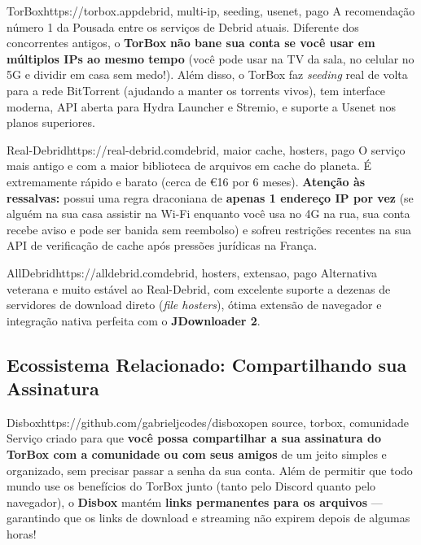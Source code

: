 \documentclass{pousadaguide}
\begin{document}
\begin{ferramenta}[goat,logo=torbox]{TorBox}{https://torbox.app}{debrid, multi-ip, seeding, usenet, pago}
A recomendação número 1 da Pousada entre os serviços de Debrid atuais. Diferente dos concorrentes antigos, o \textbf{TorBox} \textbf{não bane sua conta se você usar em múltiplos IPs ao mesmo tempo} (você pode usar na TV da sala, no celular no 5G e dividir em casa sem medo!). Além disso, o TorBox faz \emph{seeding} real de volta para a rede BitTorrent (ajudando a manter os torrents vivos), tem interface moderna, API aberta para Hydra Launcher e Stremio, e suporte a Usenet nos planos superiores. 
\end{ferramenta}

\begin{ferramenta}[recomendado,logo=real-debrid]{Real-Debrid}{https://real-debrid.com}{debrid, maior cache, hosters, pago}
O serviço mais antigo e com a maior biblioteca de arquivos em cache do planeta. É extremamente rápido e barato (cerca de €16 por 6 meses). \textbf{Atenção às ressalvas:} possui uma regra draconiana de \textbf{apenas 1 endereço IP por vez} (se alguém na sua casa assistir na Wi-Fi enquanto você usa no 4G na rua, sua conta recebe aviso e pode ser banida sem reembolso) e sofreu restrições recentes na sua API de verificação de cache após pressões jurídicas na França. 
\end{ferramenta}

\begin{ferramenta}[recomendado,logo=alldebrid]{AllDebrid}{https://alldebrid.com}{debrid, hosters, extensao, pago}
Alternativa veterana e muito estável ao Real-Debrid, com excelente suporte a dezenas de servidores de download direto (\emph{file hosters}), ótima extensão de navegador e integração nativa perfeita com o \textbf{JDownloader 2}. 
\end{ferramenta}

\subsection{Ecossistema Relacionado: Compartilhando sua Assinatura}

\begin{ferramenta}[recomendado,logo=disbox]{Disbox}{https://github.com/gabrieljcodes/disbox}{open source, torbox, comunidade}
Serviço criado para que \textbf{você possa compartilhar a sua assinatura do TorBox com a comunidade ou com seus amigos} de um jeito simples e organizado, sem precisar passar a senha da sua conta. Além de permitir que todo mundo use os benefícios do TorBox junto (tanto pelo Discord quanto pelo navegador), o \textbf{Disbox} mantém \textbf{links permanentes para os arquivos} — garantindo que os links de download e streaming não expirem depois de algumas horas! 
\end{ferramenta}
\end{document}
